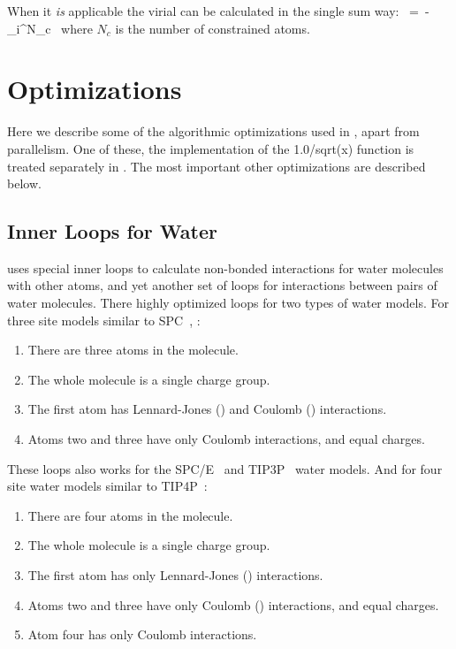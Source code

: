 When it {\em is} applicable the virial can be calculated in the single sum way:
\beq
\Xi~=~-\half\sum_i^{N_c}~\rvi\otimes\Fvi
\eeq
where $N_c$ is the number of constrained atoms.




\section{Optimizations}
Here we describe some of the algorithmic optimizations used 
in {\gromacs}, apart from parallelism. 
One of these, the implementation of the 
1.0/sqrt(x) function is treated separately in .
The most important other optimizations are described below.

\subsection{Inner Loops for Water}
\label{sec:waterloops}
{\gromacs} uses special inner loops to calculate non-bonded
interactions for water molecules with other atoms, and yet
another set of loops for interactions between pairs of
water molecules. There highly optimized loops for two types of water models.
For three site models similar to
SPC~\cite{Berendsen81}, {\ie}:
\begin{enumerate}
\item   There are three atoms in the molecule.
\item   The whole molecule is a single charge group.
\item   The first atom has Lennard-Jones () and 
        Coulomb () interactions.
\item   Atoms two and three have only Coulomb interactions, 
        and equal charges.
\end{enumerate}
These loops also works for the SPC/E~\cite{Berendsen87} and 
TIP3P~\cite{Jorgensen83} water models.
And for four site water models similar to TIP4P~\cite{Jorgensen83}:
\begin{enumerate}
\item   There are four atoms in the molecule.
\item   The whole molecule is a single charge group.
\item   The first atom has only Lennard-Jones () interactions.
\item   Atoms two and three have only Coulomb () interactions, 
        and equal charges.
\item   Atom four has only Coulomb interactions.
\end{enumerate}

